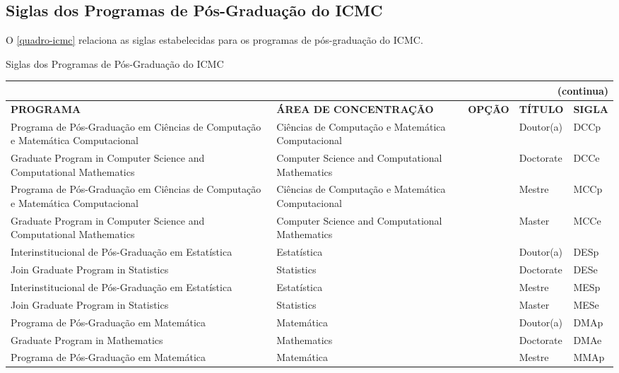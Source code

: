 \begin{apendicesenv}
\chapter{Siglas dos Programas de Pós-Graduação do ICMC}
O \autoref{quadro-icmc} relaciona as siglas estabelecidas para os programas de pós-graduação do ICMC.
\begin{quadro}[htb]
\ABNTEXfontereduzida
\caption[Siglas dos Programas de Pós-Graduação do ICMC]{Siglas dos Programas de Pós-Graduação do ICMC}
\label{quadro-icmc}
\begin{tabular}{|p{3.5cm}|p{3.5cm}|p{2.5cm}|p{2.5cm}|p{2.25cm}|}
  \multicolumn{5}{r}{{(continua)}} \\ 
  \hline
   \textbf{PROGRAMA} & \textbf{ÁREA DE CONCENTRAÇÃO} & \textbf{OPÇÃO} & \textbf{TÍTULO} & \textbf{SIGLA}  \\
    \hline 
		Programa de Pós-Graduação em Ci\^encias de Computação e Matem\'atica Computacional & Ci\^encias de Computação e Matem\'atica Computacional	&   &	Doutor(a)	 & DCCp\\
		Graduate Program in Computer Science and Computational Mathematics & Computer Science and Computational Mathematics	&   &	Doctorate & DCCe\\
	    Programa de Pós-Graduação em Ci\^encias de Computação e Matem\'atica Computacional & Ci\^encias de Computação e Matem\'atica Computacional	&   &	Mestre	& MCCp\\
	    Graduate Program in Computer Science and Computational Mathematics & Computer Science and Computational Mathematics &  & Master & MCCe\\
	    Interinstitucional de Pós-Graduação em Estatística & Estatística &  & Doutor(a)	 & DESp\\
		Join Graduate Program in Statistics & Statistics &  & Doctorate & 	DESe\\
		Interinstitucional de Pós-Graduação em Estatística & Estatística &  & Mestre & MESp\\
		Join Graduate Program in Statistics & Statistics &  & Master & MESe\\
		Programa de Pós-Graduação em Matem\'atica  & Matem\'atica &   &	Doutor(a) & DMAp\\
		Graduate Program in Mathematics & Mathematics &   & Doctorate & DMAe\\
		Programa de Pós-Graduação em Matem\'atica  & Matem\'atica &   &	Mestre & MMAp\\

	\end{tabular}
\end{quadro}


\end{apendicesenv}
